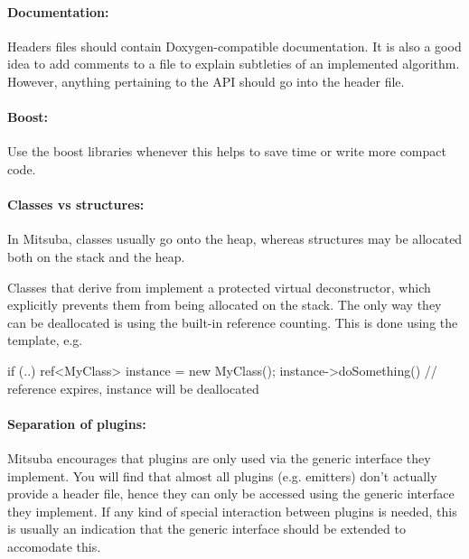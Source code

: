 \paragraph{Documentation:} Headers files should contain
Doxygen-compatible documentation. It is also a good idea to add
comments to a  file to explain subtleties of an implemented algorithm. 
However, anything pertaining to the API should go into the header file.

\paragraph{Boost:} Use the boost libraries whenever this helps to save
time or write more compact code.

\paragraph{Classes vs structures:}In Mitsuba, classes usually go onto the heap,
whereas structures may be allocated both on the stack and the heap. 

Classes that derive from  implement a protected virtual
deconstructor, which explicitly prevents them from being allocated on the stack.
The only way they can be deallocated is using the built-in reference
counting. This is done using the  template, e.g.

\begin{cpp}
if (..) {
	ref<MyClass> instance = new MyClass();
	instance->doSomething()
}   // reference expires, instance will be deallocated
\end{cpp}

\paragraph{Separation of plugins:}Mitsuba encourages that plugins are only
used via the generic interface they implement. You will find that almost all plugins
(e.g. emitters) don't actually provide a header file, hence they can only be accessed
using the generic  interface they implement. If any kind of special 
interaction between plugins is needed, this is usually an indication that the 
generic interface should be extended to accomodate this.
